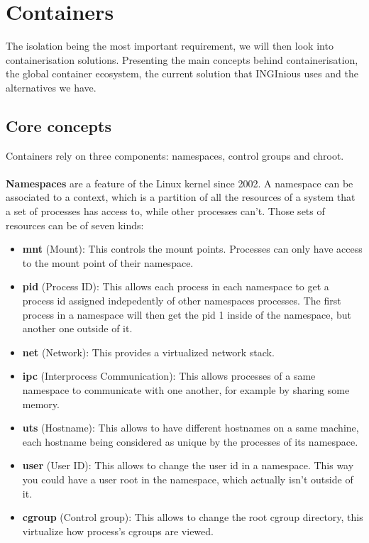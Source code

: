 \section{Containers}
The isolation being the most important requirement, we will then look into containerisation solutions.  Presenting the main concepts behind containerisation, the global container ecosystem, the current solution that INGInious uses and the alternatives we have.

\subsection{Core concepts}
Containers rely on three components: namespaces, control groups and chroot.
\paragraph{}\textbf{Namespaces} are a feature of the Linux kernel since 2002.  A namespace can be associated to a context, which is a partition of all the resources of a system that a set of processes has access to, while other processes can't.  Those sets of resources can be of seven kinds:
\begin{itemize}
\renewcommand\labelitemi{--}
  \item \textbf{mnt} (Mount): This controls the mount points.  Processes can only have access to the mount point of their namespace.
  \item \textbf{pid} (Process ID): This allows each process in each namespace to get a process id assigned indepedently of other namespaces processes.  The first process in a namespace will then get the pid 1 inside of the namespace, but another one outside of it.
  \item \textbf{net} (Network): This provides a virtualized network stack.
  \item \textbf{ipc} (Interprocess Communication): This allows processes of a same namespace to communicate with one another, for example by sharing some memory.
  \item \textbf{uts} (Hostname): This allows to have different hostnames on a same machine, each hostname being considered as unique by the processes of its namespace.
  \item \textbf{user} (User ID): This allows to change the user id in a namespace.  This way you could have a user root in the namespace, which actually isn't outside of it.
  \item \textbf{cgroup} (Control group): This allows to change the root cgroup directory, this virtualize how process's cgroups are viewed.
\end{itemize}

